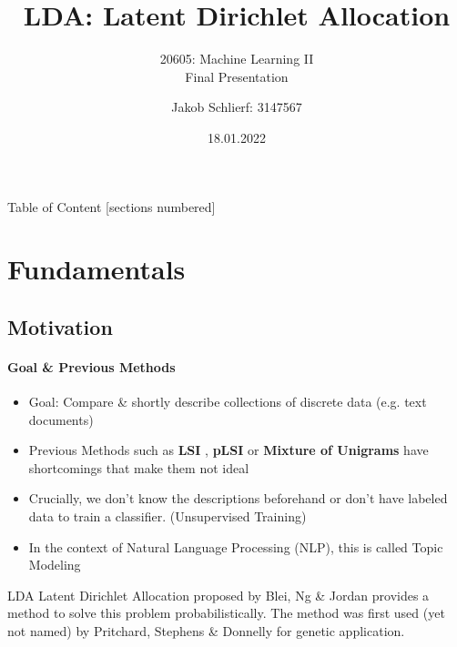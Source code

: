 \documentclass[aspectratio=169]{beamer}
\title{LDA: Latent Dirichlet Allocation}
\subtitle{20605: Machine Learning II \\ Final Presentation}
\author[JVS]{Jakob Schlierf: 3147567}
\institute{Università Bocconi}
\date{18.01.2022}
\begin{document}
\titleframe{}

\begin{frame}{Table of Content}
  [sections numbered]
  \tableofcontents
\end{frame}

\section{Fundamentals}

\subsection{Motivation}
\begin{frame}{\insertsubsectionhead}
  \framesubtitle{Goal \& Previous Methods}
  
  \begin{itemize}
    \item Goal: Compare \& shortly describe collections of discrete data (e.g. text documents) \cite{LDA}
    \item Previous Methods such as \textbf{LSI} \cite{LSI}, \textbf{pLSI} \cite{PLSI} or \textbf{Mixture of Unigrams} \cite{Unigram} have shortcomings that make them not ideal
    \item Crucially, we don't know the descriptions beforehand or don't have labeled data to train a classifier. (Unsupervised Training)
    \item In the context of Natural Language Processing (NLP), this is called Topic Modeling 
  \end{itemize}
  \begin{exampleblock}{LDA}
    Latent Dirichlet Allocation proposed by Blei, Ng \& Jordan \cite{LDA} provides a method to solve this problem probabilistically. The method was first used (yet not named) by Pritchard, Stephens \& Donnelly \cite{BIOLDA} for genetic application.
  \end{exampleblock}
\end{frame}
\end{document}
